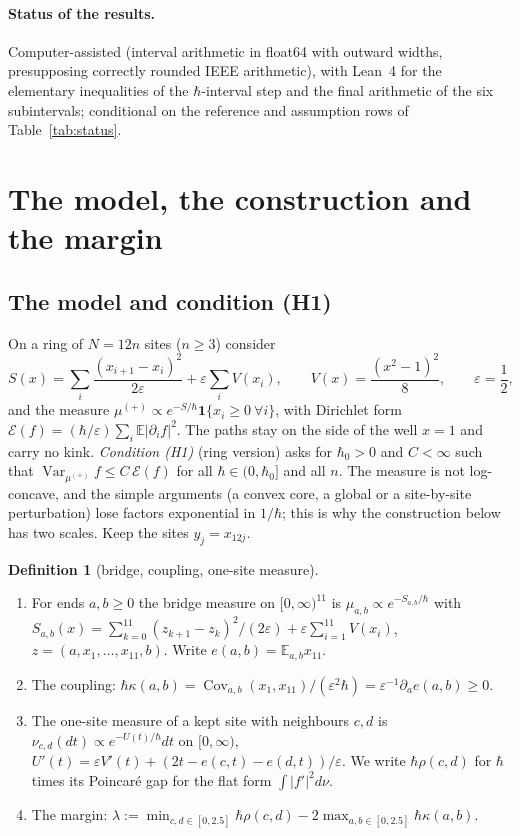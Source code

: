\documentclass[11pt,a4paper]{article}
\theoremstyle{definition}
\newtheorem{definition}[theorem]{Definition}
\theoremstyle{remark}
\newcommand{\hk}{\hbar\kappa}
\newcommand{\hr}{\hbar\rho}
\newcommand{\E}{\mathbb{E}}
\DeclareMathOperator{\Cov}{Cov}
\DeclareMathOperator{\Var}{Var}
\begin{document}
\paragraph{Status of the results.} Computer-assisted (interval arithmetic in float64 with outward widths, presupposing correctly rounded IEEE arithmetic), with Lean~4 for the elementary inequalities of the $\hbar$-interval step and the final arithmetic of the six subintervals; conditional on the reference and assumption rows of Table~\ref{tab:status}.

\section{The model, the construction and the margin}\label{sec:model}

\subsection{The model and condition (H1)}

On a ring of $N=12n$ sites ($n\ge3$) consider
\[
S(x)=\sum_i\frac{(x_{i+1}-x_i)^2}{2\varepsilon}+\varepsilon\sum_iV(x_i),\qquad V(x)=\frac{(x^2-1)^2}{8},\qquad\varepsilon=\frac12,
\]
and the measure $\mu^{(+)}\propto e^{-S/\hbar}\mathbf 1\{x_i\ge0\ \forall i\}$, with Dirichlet form $\mathcal E(f)=(\hbar/\varepsilon)\sum_i\E|\partial_if|^2$. The paths stay on the side of the well $x=1$ and carry no kink. \emph{Condition (H1)} (ring version) asks for $\hbar_0>0$ and $C<\infty$ such that $\Var_{\mu^{(+)}}f\le C\,\mathcal E(f)$ for all $\hbar\in(0,\hbar_0]$ and all $n$. The measure is not log-concave, and the simple arguments (a convex core, a global or a site-by-site perturbation) lose factors exponential in $1/\hbar$; this is why the construction below has two scales. Keep the sites $y_j=x_{12j}$.

\begin{definition}[bridge, coupling, one-site measure]\label{def:margin}
\begin{enumerate}[label=(\roman*),leftmargin=2em]
\item For ends $a,b\ge0$ the bridge measure on $[0,\infty)^{11}$ is $\mu_{a,b}\propto e^{-S_{a,b}/\hbar}$ with $S_{a,b}(x)=\sum_{k=0}^{11}(z_{k+1}-z_k)^2/(2\varepsilon)+\varepsilon\sum_{i=1}^{11}V(x_i)$, $z=(a,x_1,\dots,x_{11},b)$. Write $e(a,b)=\E_{a,b}x_{11}$.
\item The coupling: $\hk(a,b)=\Cov_{a,b}(x_1,x_{11})/(\varepsilon^2\hbar)=\varepsilon^{-1}\partial_ae(a,b)\ge0$.
\item The one-site measure of a kept site with neighbours $c,d$ is $\nu_{c,d}(dt)\propto e^{-U(t)/\hbar}dt$ on $[0,\infty)$, $U'(t)=\varepsilon V'(t)+(2t-e(c,t)-e(d,t))/\varepsilon$. We write $\hr(c,d)$ for $\hbar$ times its Poincaré gap for the flat form $\int|f'|^2d\nu$.
\item The margin: $\lambda:=\min_{c,d\in[0,2.5]}\hr(c,d)-2\max_{a,b\in[0,2.5]}\hk(a,b)$.
\end{enumerate}
\end{definition}
\end{document}
